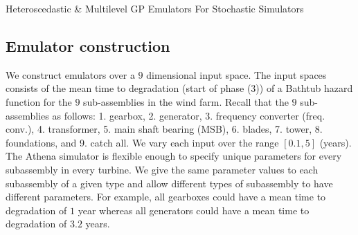 \begin{chapter}{Heteroscedastic \& Multilevel GP Emulators For Stochastic Simulators\label{Ch:Hetsml}}

\subsection{Emulator construction}
\label{sec:em-con}

We construct emulators over a $9$ dimensional input space. The input spaces consists of the mean time to degradation (start of phase (3)) of a Bathtub hazard function for the $9$ sub-assemblies in the wind farm. Recall that the $9$ sub-assemblies as follows: 1. gearbox, 2. generator, 3. frequency converter (freq. conv.), 4. transformer, 5. main shaft bearing (MSB), 6. blades, 7. tower, 8. foundations, and 9. catch all. We vary each input over the range $[0.1, 5]$ (years). The Athena simulator is flexible enough to specify unique parameters for every subassembly in every turbine. We give the same parameter values to each subassembly of a given type and allow different types of subassembly to have different parameters. For example, all gearboxes could have a mean time to degradation of $1$ year whereas all generators could have a mean time to degradation of $3.2$ years.


\end{chapter}
